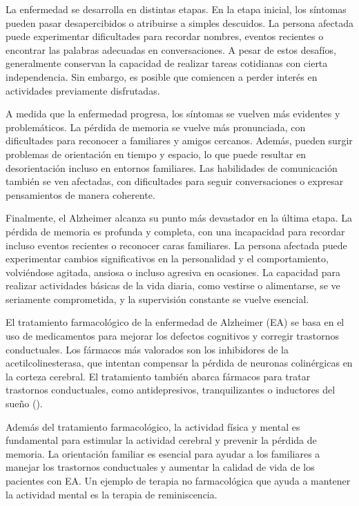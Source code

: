 La enfermedad se desarrolla en distintas etapas. En la etapa inicial, los síntomas pueden pasar desapercibidos o atribuirse a simples descuidos. La persona afectada puede experimentar dificultades para recordar nombres, eventos recientes o encontrar las palabras adecuadas en conversaciones. A pesar de estos desafíos, generalmente conservan la capacidad de realizar tareas cotidianas con cierta independencia. Sin embargo, es posible que comiencen a perder interés en actividades previamente disfrutadas.
	
A medida que la enfermedad progresa, los síntomas se vuelven más evidentes y problemáticos. La pérdida de memoria se vuelve más pronunciada, con dificultades para reconocer a familiares y amigos cercanos. Además, pueden surgir problemas de orientación en tiempo y espacio, lo que puede resultar en desorientación incluso en entornos familiares. Las habilidades de comunicación también se ven afectadas, con dificultades para seguir conversaciones o expresar pensamientos de manera coherente.

Finalmente, el Alzheimer alcanza su punto más devastador en la última etapa. La pérdida de memoria es profunda y completa, con una incapacidad para recordar incluso eventos recientes o reconocer caras familiares. La persona afectada puede experimentar cambios significativos en la personalidad y el comportamiento, volviéndose agitada, ansiosa o incluso agresiva en ocasiones. La capacidad para realizar actividades básicas de la vida diaria, como vestirse o alimentarse, se ve seriamente comprometida, y la supervisión constante se vuelve esencial.

El tratamiento farmacológico de la enfermedad de Alzheimer (EA) se basa en el uso de medicamentos para mejorar los defectos cognitivos y corregir trastornos conductuales. Los fármacos más valorados son los inhibidores de la acetilcolinesterasa, que intentan compensar la pérdida de neuronas colinérgicas en la corteza cerebral. El tratamiento también abarca fármacos para tratar trastornos conductuales, como antidepresivos, tranquilizantes o inductores del sueño (\cite{chung2000neurobehavioral}).

Además del tratamiento farmacológico, la actividad física y mental es fundamental para estimular la actividad cerebral y prevenir la pérdida de memoria. La orientación familiar es esencial para ayudar a los familiares a manejar los trastornos conductuales y aumentar la calidad de vida de los pacientes con EA. Un ejemplo de terapia no farmacológica que ayuda a mantener la actividad mental es la terapia de reminiscencia.


